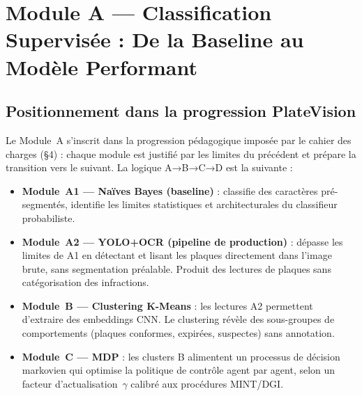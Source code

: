 %
%

\newcommand{\todo}[1]{\textcolor{red}{\textbf{[TODO: #1]}}}

\chapter{Module A — Classification Supervisée : De la Baseline au Modèle Performant}

\section{Positionnement dans la progression PlateVision}

Le Module~A s'inscrit dans la progression pédagogique imposée par le cahier
des charges (§4) : chaque module est justifié par les limites du précédent et
prépare la transition vers le suivant. La logique A→B→C→D est la suivante :

\begin{itemize}
  \item \textbf{Module~A1 — Naïves Bayes (baseline)} : classifie des
    caractères pré-segmentés, identifie les limites statistiques et
    architecturales du classifieur probabiliste.
  \item \textbf{Module~A2 — YOLO+OCR (pipeline de production)} : dépasse les
    limites de A1 en détectant et lisant les plaques directement dans l'image
    brute, sans segmentation préalable. Produit des lectures de plaques sans
    catégorisation des infractions.
  \item \textbf{Module~B — Clustering K-Means} : les lectures A2 permettent
    d'extraire des embeddings CNN. Le clustering révèle des sous-groupes de
    comportements (plaques conformes, expirées, suspectes) sans annotation.
  \item \textbf{Module~C — MDP} : les clusters B alimentent un processus
    de décision markovien qui optimise la politique de contrôle agent par
    agent, selon un facteur d'actualisation~$\gamma$ calibré aux procédures
    MINT/DGI.
\end{itemize}

